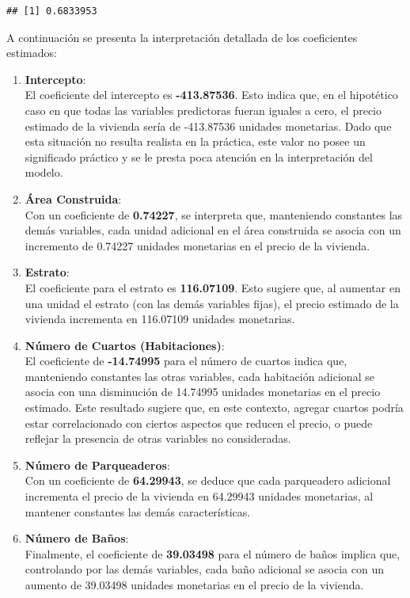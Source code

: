 \documentclass[
]{article}
\begin{document}
\begin{verbatim}
## [1] 0.6833953
\end{verbatim}

A continuación se presenta la interpretación detallada de los
coeficientes estimados:

\begin{enumerate}
\def\labelenumi{\arabic{enumi}.}
\item
  \textbf{Intercepto}:\\
  El coeficiente del intercepto es \textbf{-413.87536}. Esto indica que,
  en el hipotético caso en que todas las variables predictoras fueran
  iguales a cero, el precio estimado de la vivienda sería de -413.87536
  unidades monetarias. Dado que esta situación no resulta realista en la
  práctica, este valor no posee un significado práctico y se le presta
  poca atención en la interpretación del modelo.
\item
  \textbf{Área Construida}:\\
  Con un coeficiente de \textbf{0.74227}, se interpreta que, manteniendo
  constantes las demás variables, cada unidad adicional en el área
  construida se asocia con un incremento de 0.74227 unidades monetarias
  en el precio de la vivienda.
\item
  \textbf{Estrato}:\\
  El coeficiente para el estrato es \textbf{116.07109}. Esto sugiere
  que, al aumentar en una unidad el estrato (con las demás variables
  fijas), el precio estimado de la vivienda incrementa en 116.07109
  unidades monetarias.
\item
  \textbf{Número de Cuartos (Habitaciones)}:\\
  El coeficiente de \textbf{-14.74995} para el número de cuartos indica
  que, manteniendo constantes las otras variables, cada habitación
  adicional se asocia con una disminución de 14.74995 unidades
  monetarias en el precio estimado. Este resultado sugiere que, en este
  contexto, agregar cuartos podría estar correlacionado con ciertos
  aspectos que reducen el precio, o puede reflejar la presencia de otras
  variables no consideradas.
\item
  \textbf{Número de Parqueaderos}:\\
  Con un coeficiente de \textbf{64.29943}, se deduce que cada
  parqueadero adicional incrementa el precio de la vivienda en 64.29943
  unidades monetarias, al mantener constantes las demás características.
\item
  \textbf{Número de Baños}:\\
  Finalmente, el coeficiente de \textbf{39.03498} para el número de
  baños implica que, controlando por las demás variables, cada baño
  adicional se asocia con un aumento de 39.03498 unidades monetarias en
  el precio de la vivienda.
\end{enumerate}
\end{document}
